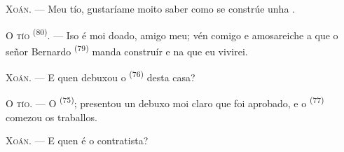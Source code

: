 %
%

\VUsaut{6.0mm}
\VUsaut{1.4mm}
\VUsaut{2.2mm}

\VUsaut{3.0mm}

\textsc{Xoán}. --- Meu tío, gustaríame moito saber como se constrúe unha
.

\textsc{O tío} \textsuperscript{(80)}. --- Iso é moi doado, amigo meu; vén comigo e
amosareiche a que o señor Bernardo \textsuperscript{(79)} manda construír e na que eu vivirei.

\textsc{Xoán}. --- E quen debuxou o  \textsuperscript{(76)} desta casa?

\textsc{O tío}. --- O  \textsuperscript{(75)}; presentou un debuxo moi
claro que foi aprobado, e o  \textsuperscript{(77)} comezou os traballos.

\textsc{Xoán}. --- E quen é o contratista?

